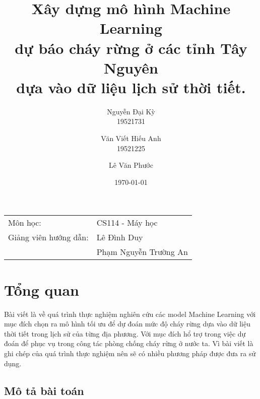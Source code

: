 \documentclass{article}
\begin{document}
\title{
      \LARGE{
            \textbf{
                  Xây dựng mô hình Machine Learning \\ dự báo cháy rừng ở các tỉnh Tây Nguyên \\ dựa vào dữ liệu lịch sử thời tiết.
            }
      }
}

\author{
      Nguyễn Đại Kỳ\\
      19521731\\
      \and
      Văn Viết Hiếu Anh\\
      19521225
      \and
      Lê Văn Phước\\

}

\date{\today} %
\maketitle %
\begin{center}
      \begin{tabular}{l l}
            Môn học:              & CS114 - Máy học       \\
            Giảng viên hướng dẫn: & Lê Đình Duy           \\
                                  & Phạm Nguyễn Trường An \\
      \end{tabular}
\end{center}

\tableofcontents

\pagebreak


\section{Tổng quan}
\qquad Bài viết là về quá trình thực nghiệm nghiên cứu các model Machine Learning với mục đích chọn ra mô hình tối ưu để dự đoán mức độ cháy rừng dựa vào dữ liệu thời tiết trong lịch sử của từng địa phương. Với mục đích hổ trợ trong việc dự đoán để phục vụ trong công tác phòng chống cháy rừng ở nước ta. Vì bài viết là ghi chép của quá trình thực nghiệm nên sẽ có nhiều phương pháp được đưa ra sử dụng.
\subsection{Mô tả bài toán}
\end{document}
